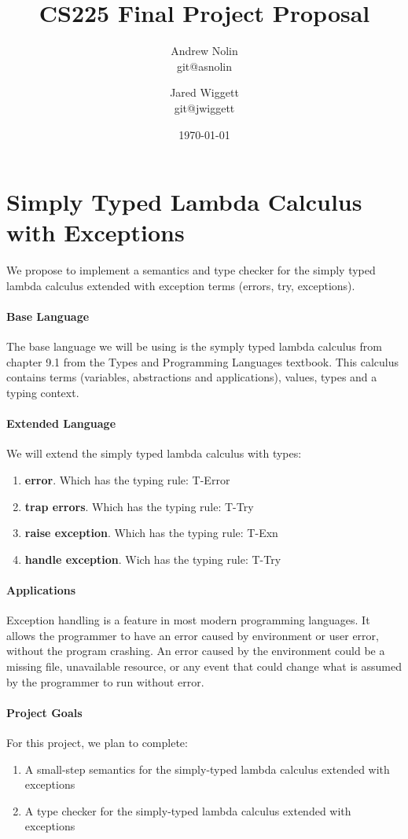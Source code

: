 \documentclass{article}
\title{CS225 Final Project Proposal}
\author{Andrew Nolin \\ git@asnolin \and Jared Wiggett \\ git@jwiggett}
\date{\today}
\begin{document}
\maketitle
\section*{Simply Typed Lambda Calculus with Exceptions}
We propose to implement a semantics and type checker for the simply typed lambda calculus extended with exception terms (errors, try, exceptions). 


\paragraph{Base Language}
The base language we will be using is the symply typed lambda calculus from chapter 9.1 from the Types and Programming Languages textbook. This calculus contains terms (variables, abstractions and  applications), values, types and a typing context.
\paragraph{Extended Language}
We will extend the simply typed lambda calculus with types: 
\begin{enumerate}
	\item \textbf{error}. Which has the typing rule: T-Error
	\item \textbf{trap errors}. Which has the typing rule: T-Try
	\item \textbf{raise exception}. Which has the typing rule: T-Exn
	\item \textbf{handle exception}. Wich has the typing rule: T-Try
\end{enumerate}
\paragraph{Applications}
Exception handling is a feature in most modern programming languages. It allows the programmer to have an error caused by environment or user error, without the program crashing. An error caused by the environment could be a missing file, unavailable resource, or any event that could change what is assumed by the programmer to run without error. 
\paragraph{Project Goals}
For this project, we plan to complete:
\begin{enumerate}
\item A small-step semantics for the simply-typed lambda calculus extended with exceptions
\item A type checker for the simply-typed lambda calculus extended with exceptions
	\end{enumerate}
\end{document}
